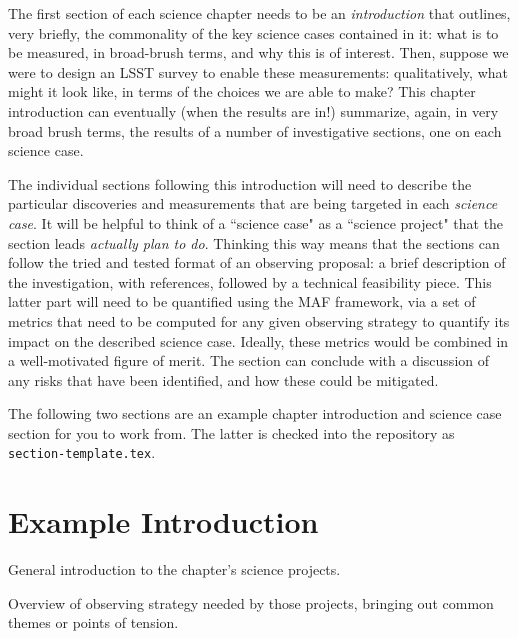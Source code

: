 The first section of each science chapter needs to be an {\it introduction}
that outlines, very briefly, the commonality of the key science cases
contained in it:  what is to be measured, in broad-brush terms, and
why this is of interest. Then, suppose we were to design an LSST
survey to enable these measurements: qualitatively, what might it look
like, in terms of the choices we are able to make? This chapter
introduction can eventually (when the results are in!) summarize,
again, in very broad brush terms, the results of a number of
investigative sections, one on each science case.

The individual sections following this introduction will need to
describe the particular discoveries and measurements that are being
targeted in each {\it science case}. It will be helpful to think of a
``science case" as a ``science project" that the section leads {\it
actually plan to do}. Thinking this way means that the sections can
follow the tried and tested format of an observing proposal: a brief
description of the investigation, with references, followed by a
technical feasibility piece.  This latter part will need to be
quantified using the MAF framework, via a set of metrics that need to
be computed for any given observing strategy to quantify its impact on
the described science case. Ideally, these metrics would be combined
in a well-motivated figure of merit. The section can conclude with a
discussion of any risks that have been identified, and how these could
be mitigated.

The following two sections are an example chapter introduction and
science case section for you to work from. The latter is checked into
the repository as \texttt{section-template.tex}.


\section{Example Introduction}

General introduction to the chapter's science projects.

Overview of observing strategy needed by those projects, bringing
out common themes or points of tension.




